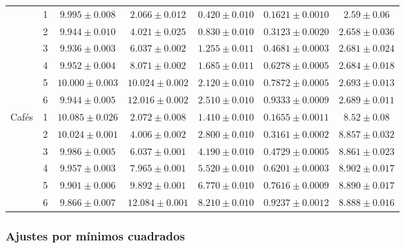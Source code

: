 \begin{table}[!htb]
\begin{tabular}{c c c c c c c}
          & 1 & $9.995 \pm 0.008$  & $2.066 \pm 0.012$  & $0.420 \pm 0.010$ & $0.1621 \pm 0.0010$ & $2.59 \pm 0.06$ \\
          & 2 & $9.944 \pm 0.010$  & $4.021 \pm 0.025$  & $0.830 \pm 0.010$ & $0.3123 \pm 0.0020$ & $2.658 \pm 0.036$ \\
          & 3 & $9.936 \pm 0.003$  & $6.037 \pm 0.002$  & $1.255 \pm 0.011$ & $0.4681 \pm 0.0003$ & $2.681 \pm 0.024$ \\
          & 4 & $9.952 \pm 0.004$  & $8.071 \pm 0.002$  & $1.685 \pm 0.011$ & $0.6278 \pm 0.0005$ & $2.684 \pm 0.018$ \\
          & 5 & $10.000 \pm 0.003$ & $10.024 \pm 0.002$ & $2.120 \pm 0.010$ & $0.7872 \pm 0.0005$ & $2.693 \pm 0.013$ \\
          & 6 & $9.944 \pm 0.005$  & $12.016 \pm 0.002$ & $2.510 \pm 0.010$ & $0.9333 \pm 0.0009$ & $2.689 \pm 0.011$ \\
        \midrule
        \multirow{6}{*}{Cafés}
          & 1 & $10.085 \pm 0.026$ & $2.072 \pm 0.008$  & $1.410 \pm 0.010$ & $0.1655 \pm 0.0011$ & $8.52 \pm 0.08$ \\
          & 2 & $10.024 \pm 0.001$ & $4.006 \pm 0.002$  & $2.800 \pm 0.010$ & $0.3161 \pm 0.0002$ & $8.857 \pm 0.032$ \\
          & 3 & $9.986 \pm 0.005$  & $6.037 \pm 0.001$  & $4.190 \pm 0.010$ & $0.4729 \pm 0.0005$ & $8.861 \pm 0.023$ \\
          & 4 & $9.957 \pm 0.003$  & $7.965 \pm 0.001$  & $5.520 \pm 0.010$ & $0.6201 \pm 0.0003$ & $8.902 \pm 0.017$ \\
          & 5 & $9.901 \pm 0.006$  & $9.892 \pm 0.001$  & $6.770 \pm 0.010$ & $0.7616 \pm 0.0009$ & $8.890 \pm 0.017$ \\
          & 6 & $9.866 \pm 0.007$  & $12.084 \pm 0.001$ & $8.210 \pm 0.010$ & $0.9237 \pm 0.0012$ & $8.888 \pm 0.016$ \\
        \bottomrule
    \end{tabular}
\end{table}

\subsubsection{Ajustes por mínimos cuadrados}

